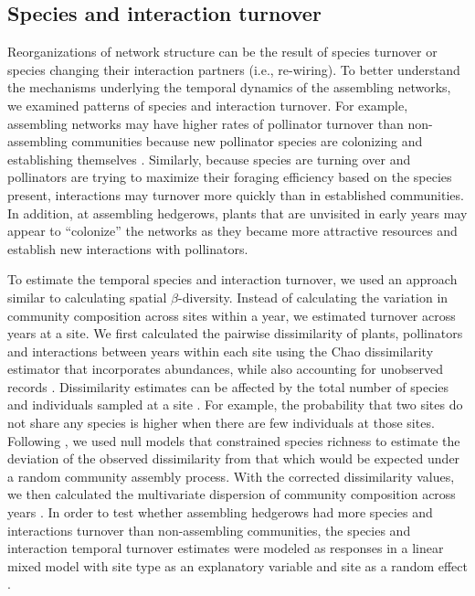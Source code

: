 \documentclass[12pt]{article}
\begin{document}
\subsection*{Species and interaction turnover}

Reorganizations of network structure can be the result of species
turnover or species changing their interaction partners (i.e.,
re-wiring). To better understand the mechanisms underlying the
temporal dynamics of the assembling networks, we examined patterns of
species and interaction turnover. For example, assembling networks may
have higher rates of pollinator turnover than non-assembling
communities because new pollinator species are colonizing and
establishing themselves \citep{mgonigle-2015-x}. Similarly, because
species are turning over and pollinators are trying to maximize their
foraging efficiency based on the species present, interactions may
turnover more quickly than in established communities. In addition, at
assembling hedgerows, plants that are unvisited in early years may
appear to ``colonize'' the networks as they became more attractive
resources and establish new interactions with pollinators.

To estimate the temporal species and interaction turnover, we used an
approach similar to calculating spatial $\beta$-diversity. Instead of
calculating the variation in community composition across sites within
a year, we estimated turnover across years at a site. We first
calculated the pairwise dissimilarity of plants, pollinators and
interactions between years within each site using the Chao
dissimilarity estimator that incorporates abundances, while also
accounting for unobserved records \citep{chao-2005-148}. Dissimilarity
estimates can be affected by the total number of species and
individuals sampled at a site \citep[e.g.,][]{ponisio2015farm}. For
example, the probability that two sites do not share any species is
higher when there are few individuals at those sites. Following
\cite{ponisio2015farm}, we used null models that constrained species
richness to estimate the deviation of the observed dissimilarity from
that which would be expected under a random community assembly
process. With the corrected dissimilarity values, we then calculated
the multivariate dispersion of community composition across years
\citep{anderson-2011-19}. In order to test whether assembling
hedgerows had more species and interactions turnover than
non-assembling communities, the species and interaction temporal
turnover estimates were modeled as responses in a linear mixed model
with site type as an explanatory variable and site as a random effect
\citep{lme4, lmetest}.
\end{document}
